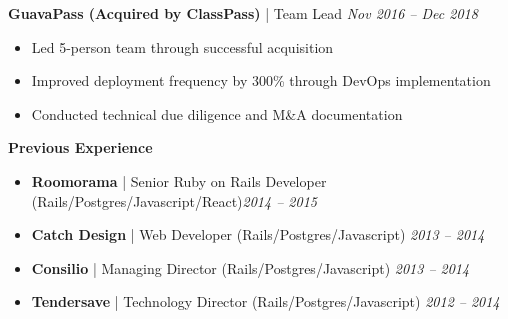 \documentclass[letterpaper,10pt]{article}
\begin{document}
\textbf{GuavaPass (Acquired by ClassPass)} | Team Lead \hfill \textit{Nov 2016 -- Dec 2018}
\begin{itemize}[leftmargin=*, nosep]
    \item Led 5-person team through successful acquisition
    \item Improved deployment frequency by 300\% through DevOps implementation
    \item Conducted technical due diligence and M\&A documentation
\end{itemize}

\textbf{Previous Experience}
\begin{itemize}[leftmargin=*, nosep]
    \item \textbf{Roomorama} | Senior Ruby on Rails Developer (Rails/Postgres/Javascript/React)\hfill \textit{2014 -- 2015}
    \item \textbf{Catch Design} | Web Developer (Rails/Postgres/Javascript) \hfill \textit{2013 -- 2014}
    \item \textbf{Consilio} | Managing Director  (Rails/Postgres/Javascript) \hfill \textit{2013 -- 2014}
    \item \textbf{Tendersave} | Technology Director (Rails/Postgres/Javascript) \hfill \textit{2012 -- 2014}
\end{itemize}
\end{document}
